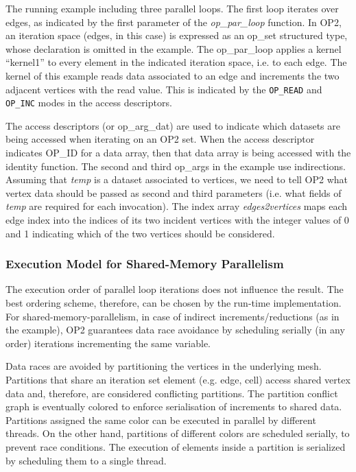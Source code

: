 The running example including three parallel loops. The first loop iterates over edges, as indicated by the first parameter of the {\it op\_par\_loop} function. In OP2, an iteration space (edges, in this case) is expressed as an op\_set structured type, whose declaration is omitted in the example. The op\_par\_loop applies a kernel ``kernel1'' to every element in the indicated iteration space, i.e. to each edge. The kernel of this example reads data associated to an edge and increments the two adjacent vertices with the read value. This is indicated by the {\tt OP\_READ} and {\tt OP\_INC} modes in the access descriptors.

The access descriptors (or op\_arg\_dat) are used to indicate which datasets are being accessed when iterating on an OP2 set. When the access descriptor indicates OP\_ID for a data array, then that data array is being accessed with the identity function. The second and third op\_args in the example use indirections. Assuming that {\it temp} is a dataset associated to vertices, we need to tell OP2 what vertex data should be passed as second and third parameters (i.e. what fields of {\it temp} are required for each invocation). The index array {\it edges2vertices} maps each edge index into the indices of its two incident vertices with the integer values of 0 and 1 indicating which of the two vertices should be considered.

\subsubsection{Execution Model for Shared-Memory Parallelism}
The execution order of parallel loop iterations does not influence the result. The best ordering scheme, therefore, can be chosen by the run-time implementation. For shared-memory-parallelism, in case of indirect increments/reductions (as in the example), OP2 guarantees data race avoidance by scheduling serially (in any order) iterations incrementing the same variable.

Data races are avoided by partitioning the vertices in the underlying mesh. Partitions that share an iteration set element (e.g. edge, cell) access shared vertex data and, therefore, are considered conflicting partitions. The partition conflict graph is eventually colored to enforce serialisation of increments to shared data. Partitions assigned the same color can be executed in parallel by different threads. On the other hand, partitions of different colors are scheduled serially, to prevent race conditions. The execution of elements inside a partition is serialized by scheduling them to a single thread.


